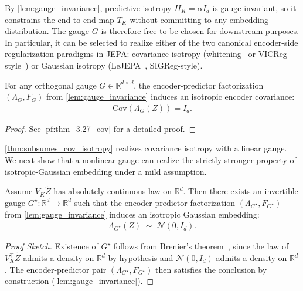 
By \cref{lem:gauge_invariance}, predictive isotropy $H_K = \alpha I_d$ is gauge-invariant, so it constrains the end-to-end map $T_K$ without committing to any embedding distribution.
The gauge $G$ is therefore free to be chosen for downstream purposes. 
In particular, it can be selected to realize either of the two canonical encoder-side regularization paradigms in JEPA: 
covariance isotropy (whitening~\citep{ermolov2021whitening} or VICReg-style~\citep{bardes2021vicreg}) or Gaussian isotropy (LeJEPA~\citep{balestriero2025lejepa}, SIGReg-style).




\begin{theorem}
\label{thm:subsumes_cov_isotropy}
For any orthogonal gauge $G \in \mathbb{R}^{d \times d}$,
the encoder-predictor factorization $(\Lambda_G, F_G)$ from
\cref{lem:gauge_invariance} induces an isotropic encoder covariance:
\begin{align*}
    \mathrm{Cov}(\Lambda_G(Z)) = I_d.
\end{align*}
\end{theorem}
\begin{proof}
See \cref{pf:thm_3.27_cov} for a detailed proof.
\end{proof}








\cref{thm:subsumes_cov_isotropy} realizes covariance isotropy with a linear gauge.
We next show that a nonlinear gauge can realize the strictly stronger property of isotropic-Gaussian embedding under a mild assumption.

\begin{theorem}
\label{thm:subsumes_gaussian_isotropy}
Assume $V_K^\top \widetilde Z$ has absolutely continuous law on $\mathbb{R}^d$. 
Then there exists an invertible gauge $G^\star: \mathbb{R}^d \to \mathbb{R}^d$ such that the encoder-predictor factorization $(\Lambda_{G^\star}, F_{G^\star})$ from \cref{lem:gauge_invariance} induces an isotropic Gaussian embedding:
\begin{align*}
\Lambda_{G^\star}(Z) \;\sim\; \mathcal{N}(0, I_d).
\end{align*}
\end{theorem}
\begin{proof}[Proof Sketch]
Existence of $G^\star$ follows from Brenier's theorem~\citep{villani2009optimal}, since the law of $V_K^\top \widetilde Z$ admits a density on $\mathbb{R}^d$ by hypothesis and $\mathcal{N}(0, I_d)$ admits a density on $\mathbb{R}^d$. The encoder-predictor pair $(\Lambda_{G^\star}, F_{G^\star})$ then satisfies the conclusion by construction (\cref{lem:gauge_invariance}).
\end{proof}


